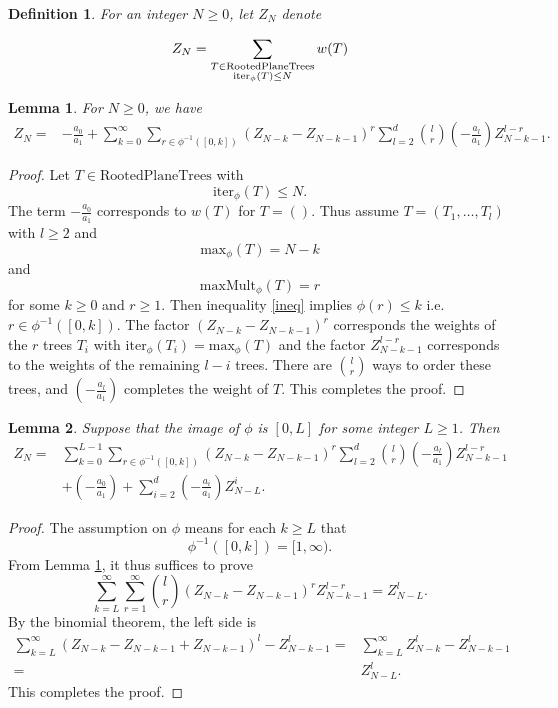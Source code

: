 \documentclass[10pt,a4paper]{amsart}
\newtheorem{lemma}{Lemma}
\newtheorem{definition}{Definition}
\newcommand{\iter}{\mathrm{iter}_\phi}
\newcommand{\maxphi}{\mathrm{max}_\phi}
\newcommand{\maxMult}{\mathrm{maxMult}_\phi}
\begin{document}
\begin{definition} 
For an integer $N \geq 0$, let $Z_N$ denote 

\[
Z_N = \sum_{\substack{ T \in \mathrm{RootedPlaneTrees} \\ \iter(T) \leq N }} w(T) \\ 
\]

\end{definition}

\begin{lemma} \label{l krsum}
For $N\geq 0$, we have
\begin{align}
Z_N = & -\frac{a_0}{a_1}+\sum_{k=0}^{\infty} \sum_{r \in \phi^{-1}([0,k])} (Z_{N-k}-Z_{N-k-1})^r \sum_{l=2}^d { l \choose r} (-\frac{a_l}{a_1})Z_{N-k-1}^{l-r}. 
         \end{align}
\end{lemma}

\begin{proof}
Let $T \in \mathrm{RootedPlaneTrees}$ with 
\begin{equation} \label{ineq}
\iter(T) \leq N.
\end{equation}
 The term $ -\frac{a_0}{a_1}$ corresponds to $w(T)$ for $T=()$. Thus assume $T = (T_1, \ldots, T_l)$ with $l \geq 2$ and \[\maxphi(T)=N-k\] and \[\maxMult(T) = r\] for some $k \geq 0$ and $r \geq 1$. Then inequality \eqref{ineq} implies $\phi(r) \leq k$ i.e. $r \in \phi^{-1}([0,k])$. The factor $(Z_{N-k}-Z_{N-k-1})^r$ corresponds the weights of the $r$ trees $T_i$ with $\iter(T_i) = \maxphi(T)$ and the factor $Z_{N-k-1}^{l-r}$ corresponds to the weights of the remaining $l-i$ trees. There are ${ l \choose r}$ ways to order these trees, and $(-\frac{a_l}{a_1})$ completes the weight of $T$. This completes the proof. 
 \end{proof}

\begin{lemma} \label{l krsum L}
Suppose that the image of $\phi$ is $[0,L]$ for some integer $L \geq 1$. Then
\begin{align}
Z_N = &\sum_{k=0}^{L-1} \sum_{r \in \phi^{-1}([0,k])} (Z_{N-k}-Z_{N-k-1})^r \sum_{l=2}^d { l \choose r} (-\frac{a_l}{a_1})Z_{N-k-1}^{l-r}  \label{krsum L sum}\\
         & + (-\frac{a_0}{a_1})+\sum_{i=2}^d  (-\frac{a_i}{a_1}) Z_{N-L}^i. \label{krsum L f}
\end{align}
\end{lemma}
\begin{proof}
The assumption on $\phi$ means for each $k \geq L$ that
\[
\phi^{-1}([0,k]) =  [1,\infty).
\]
From Lemma \ref{l krsum}, it thus suffices to prove  
\[
\sum_{k=L}^{\infty} \sum_{r =1}^\infty { l \choose r} (Z_{N-k}-Z_{N-k-1})^r  Z_{N-k-1}^{l-r} =   Z_{N-L}^l.
\]
By the binomial theorem, the left side is 
\begin{align*}
\sum_{k=L}^{\infty} (Z_{N-k}-Z_{N-k-1}+ Z_{N-k-1})^l  -   Z_{N-k-1}^l   = &\sum_{k=L}^{\infty} Z_{N-k}^l  -   Z_{N-k-1}^l \\ 
=& Z_{N-L}^l.
\end{align*}
 This completes the proof. 
\end{proof}
\end{document}
